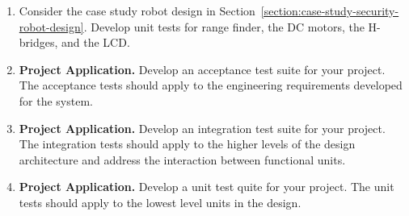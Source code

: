 \begin{enumerate}
\item
  Consider the case study robot design in Section~\ref{section:case-study-security-robot-design}. 
  Develop unit
  tests for range finder, the DC motors, the H-bridges, and the LCD.
\item
  \textbf{Project Application.} Develop an acceptance test suite for
  your project. The acceptance tests should apply to the engineering
  requirements developed for the system.
\item
  \textbf{Project Application.} Develop an integration test suite for
  your project. The integration tests should apply to the higher levels
  of the design architecture and address the interaction between
  functional units.
\item
  \textbf{Project Application.} Develop a unit test quite for your
  project. The unit tests should apply to the lowest level units in the
  design.
\end{enumerate}
